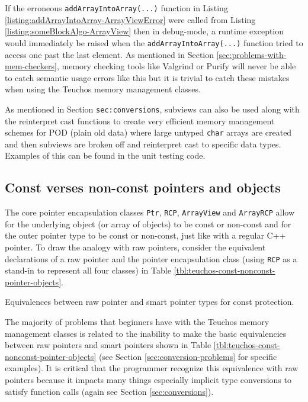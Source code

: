 \documentclass[pdf,ps2pdf,11pt]{SANDreport}
\begin{document}
If the erroneous {}\texttt{addArrayIntoArray(...)} function in Listing
{}\ref{listing:addArrayIntoArray-ArrayViewError} were called from
Listing {}\ref{listing:someBlockAlgo-ArrayView} then in debug-mode, a
runtime exception would immediately be raised when the
{}\texttt{addArrayIntoArray(...)} function tried to access one past
the last element.  As mentioned in Section
{}\ref{sec:problems-with-mem-checkers}, memory checking tools like
Valgrind or Purify will never be able to catch semantic usage errors
like this but it is trivial to catch these mistakes when using the
Teuchos memory management classes.

As mentioned in Section {}\texttt{sec:conversions}, subviews can also
be used along with the reinterpret cast functions to create very
efficient memory management schemes for POD (plain old data) where
large untyped {}\texttt{char} arrays are created and then subviews are
broken off and reinterpret cast to specific data types.  Examples of
this can be found in the unit testing code.


%
{}\subsection{Const verses non-const pointers and objects}
\label{sec:teuchos-const-nonconst-pointer-objects}
%

The core pointer encapsulation classes {}\texttt{Ptr},
{}\texttt{RCP}, {}\texttt{ArrayView} and {}\texttt{ArrayRCP} allow for
the underlying object (or array of objects) to be const or non-const
and for the outer pointer type to be const or non-const, just like
with a regular C++ pointer.  To draw the analogy with raw pointers,
consider the equivalent declarations of a raw pointer and the pointer
encapsulation class (using {}\texttt{RCP} as a stand-in to represent
all four classes) in Table
{}\ref{tbl:teuchos-const-nonconst-pointer-objects}.

\begin{table}
%
\begin{center}
%
%

%
%
\end{center}
\caption{\label{tbl:teuchos-const-nonconst-pointer-objects}
Equivalences between raw pointer and smart pointer types for const
protection.}
%
\end{table}

The majority of problems that beginners have with the Teuchos memory
management classes is related to the inability to make the basic
equivalencies between raw pointers and smart pointers shown in Table
{}\ref{tbl:teuchos-const-nonconst-pointer-objects} (see Section
{}\ref{sec:conversion-problems} for specific examples).  It is
critical that the programmer recognize this equivalence with raw
pointers because it impacts many things especially implicit type
conversions to satisfy function calls (again see Section
{}\ref{sec:conversions}).
\end{document}
